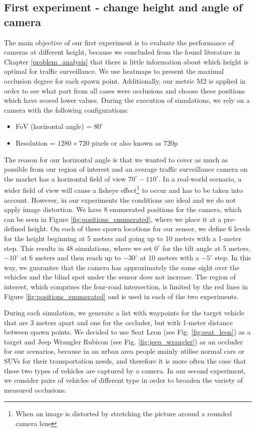 \subsection{First experiment - change height and angle of camera}
The main objective of our first experiment is to evaluate the performance of cameras at different height, because we concluded from the found literature in Chapter \ref{problem_analysis} that there is little information about which height is optimal for traffic surveillance. We use heatmaps to present the maximal occlusion degree for each spawn point. Additionally, our metric M2 is applied in order to see what part from all cases were occlusions and choose these positions which have scored lower values. During the execution of simulations, we rely on a camera with the following configurations:
\begin{itemize}
    \item FoV (horizontal angle) = $80^{\circ}$
    \item Resolution = $1280\times720$ pixels or also known as 720p
\end{itemize}
The reason for our horizontal angle is that we wanted to cover as much as possible from our region of interest and an average traffic surveillance camera on the market has a horizontal field of view $70^{\circ} - 110^{\circ}$. In a real-world scenario, a wider field of view will cause a fisheye effect\footnote{When an image is distorted by stretching the picture around a rounded camera lens} to occur and has to be taken into account. However, in our experiments the conditions are ideal and we do not apply image distortion. We have 8 enumerated positions for the camera, which can be seen in Figure \ref{fig:positions_enumerated}, where we place it at a pre-defined height. On each of these spawn locations for our sensor, we define 6 levels for the height beginning at 5 meters and going up to 10 meters with a 1-meter step. This results in 48 simulations, where we set $0^{\circ}$ for the tilt angle at 5 meters, $-10^{\circ}$ at 6 meters and then reach up to $-30^{\circ}$ at 10 meters with a $-5^{\circ}$ step. In this way, we guarantee that the camera has approximately the same sight over the vehicles and the blind spot under the sensor does not increase. The region of interest, which comprises the four-road intersection, is limited by the red lines in Figure \ref{fig:positions_enumerated} and is used in each of the two experiments.

During each simulation, we generate a list with waypoints for the target vehicle that are 3 meters apart and one for the occluder, but with 1-meter distance between spawn points. We decided to use Seat Leon (see Fig. \ref{fig:seat_leon}) as a target and Jeep Wrangler Rubicon (see Fig. \ref{fig:jeep_wrangler}) as an occluder for our scenarios, because in an urban area people mainly utilise normal cars or SUVs for their transportation needs, and therefore it is more often the case that these two types of vehicles are captured by a camera. In our second experiment, we consider pairs of vehicles of different type in order to broaden the variety of measured occlusions.

